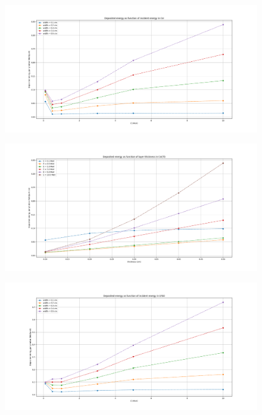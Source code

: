 \documentclass{article}
\begin{document}
\begin{figure}[H]

  \centering
  \includegraphics[width=\linewidth]{images/task2/dep_energy_en_CsI_particle.png}

\end{figure}

\begin{figure}[H]
  \centering
  \includegraphics[width=\linewidth]{images/task2/dep_energy_thickness_CsI_particle.png}
\end{figure}

\begin{figure}[H]
  \centering
  \includegraphics[width=\linewidth]{images/task2/dep_energy_en_LYSO_particle.png}
\end{figure}
\end{document}
